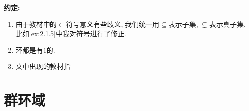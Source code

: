 \textbf{约定:} \begin{enumerate}
    \item 由于教材中的$\subset$符号意义有些歧义, 我们统一用$\subseteq$表示子集, $\subsetneq$表示真子集, 比如\ref{ex:2.1.5}中我对符号进行了修正.
    \item 环都是有$1$的.
    \item 文中出现的教材指\cite{2022抽象代数}
\end{enumerate}

\section{群环域}



